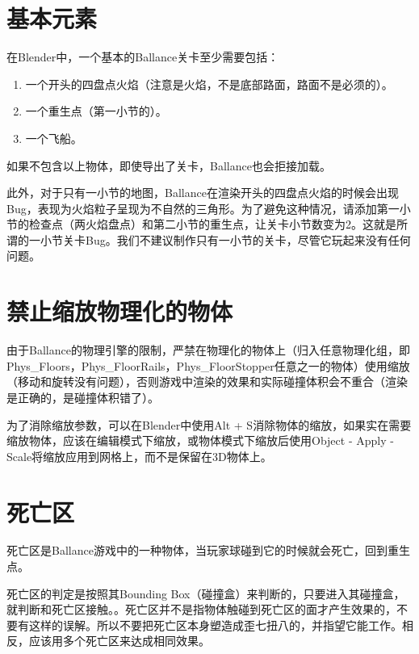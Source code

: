 
\section{基本元素}

在Blender中，一个基本的Ballance关卡至少需要包括：

\begin{enumerate}

\item 一个开头的四盘点火焰（注意是火焰，不是底部路面，路面不是必须的）。

\item 一个重生点（第一小节的）。

\item 一个飞船。

\end{enumerate}

如果不包含以上物体，即使导出了关卡，Ballance也会拒接加载。

此外，对于只有一小节的地图，Ballance在渲染开头的四盘点火焰的时候会出现Bug，表现为火焰粒子呈现为不自然的三角形。为了避免这种情况，请添加第一小节的检查点（两火焰盘点）和第二小节的重生点，让关卡小节数变为2。这就是所谓的一小节关卡Bug。我们不建议制作只有一小节的关卡，尽管它玩起来没有任何问题。

\section{禁止缩放物理化的物体}

由于Ballance的物理引擎的限制，严禁在物理化的物体上（归入任意物理化组，即Phys\_Floors，Phys\_FloorRails，Phys\_FloorStopper任意之一的物体）使用缩放（移动和旋转没有问题），否则游戏中渲染的效果和实际碰撞体积会不重合（渲染是正确的，是碰撞体积错了）。

为了消除缩放参数，可以在Blender中使用Alt + S消除物体的缩放，如果实在需要缩放物体，应该在编辑模式下缩放，或物体模式下缩放后使用Object - Apply - Scale将缩放应用到网格上，而不是保留在3D物体上。

\section{死亡区}

死亡区是Ballance游戏中的一种物体，当玩家球碰到它的时候就会死亡，回到重生点。

死亡区的判定是按照其Bounding Box（碰撞盒）来判断的，只要进入其碰撞盒，就判断和死亡区接触。。死亡区并不是指物体触碰到死亡区的面才产生效果的，不要有这样的误解。所以不要把死亡区本身塑造成歪七扭八的，并指望它能工作。相反，应该用多个死亡区来达成相同效果。

